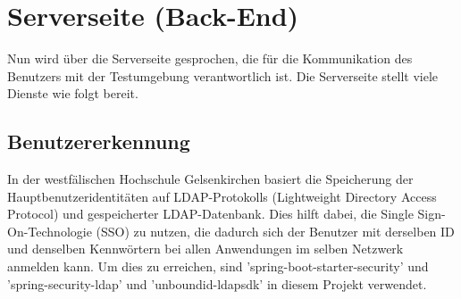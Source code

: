 \documentclass[a4paper,12pt,oneside]{book}
\begin{document}
\section{Serverseite (Back-End)}
Nun wird über die Serverseite gesprochen, die für die Kommunikation des Benutzers mit der Testumgebung verantwortlich ist.
\newline
Die Serverseite stellt viele Dienste wie folgt bereit.
\subsection{Benutzererkennung} In der westfälischen Hochschule Gelsenkirchen basiert die Speicherung der Hauptbenutzeridentitäten auf LDAP-Protokolls (Lightweight Directory Access Protocol) und gespeicherter LDAP-Datenbank. Dies hilft dabei, die Single Sign-On-Technologie (SSO) zu nutzen, die dadurch sich der Benutzer mit derselben ID und denselben Kennwörtern bei allen Anwendungen im selben Netzwerk anmelden kann. Um dies zu erreichen, sind 'spring-boot-starter-security' und 'spring-security-ldap' und 'unboundid-ldapsdk' in diesem Projekt verwendet.
\end{document}
